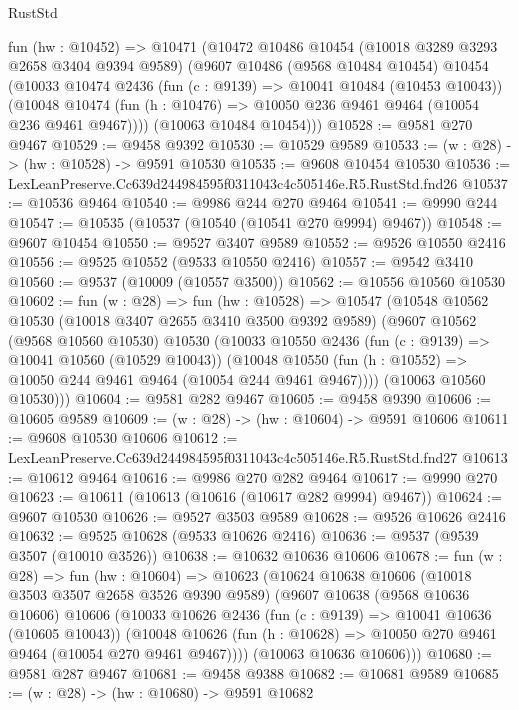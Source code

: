 \begin{lexlean}{RustStd}
\begin{coremodule}
  fun (hw : @10452) =>
  @10471
    (@10472
      @10486
      @10454
      (@10018 @3289 @3293 @2658 @3404 @9394 @9589)
      (@9607
        @10486
        (@9568 @10484 @10454)
        @10454
        (@10033
          @10474
          @2436
          (fun (c : @9139) => @10041 @10484 (@10453 @10043))
          (@10048 @10474 (fun (h : @10476) => @10050 @236 @9461 @9464 (@10054 @236 @9461 @9467))))
        (@10063 @10484 @10454)))
@10528 := @9581 @270 @9467
@10529 := @9458 @9392
@10530 := @10529 @9589
@10533 := (w : @28) -> (hw : @10528) -> @9591 @10530
@10535 := @9608 @10454 @10530
@10536 := LexLeanPreserve.Cc639d244984595f0311043c4c505146e.R5.RustStd.fnd26
@10537 := @10536 @9464
@10540 := @9986 @244 @270 @9464
@10541 := @9990 @244
@10547 := @10535 (@10537 (@10540 (@10541 @270 @9994) @9467))
@10548 := @9607 @10454
@10550 := @9527 @3407 @9589
@10552 := @9526 @10550 @2416
@10556 := @9525 @10552 (@9533 @10550 @2416)
@10557 := @9542 @3410
@10560 := @9537 (@10009 (@10557 @3500))
@10562 := @10556 @10560 @10530
@10602 := fun (w : @28) =>
  fun (hw : @10528) =>
  @10547
    (@10548
      @10562
      @10530
      (@10018 @3407 @2655 @3410 @3500 @9392 @9589)
      (@9607
        @10562
        (@9568 @10560 @10530)
        @10530
        (@10033
          @10550
          @2436
          (fun (c : @9139) => @10041 @10560 (@10529 @10043))
          (@10048 @10550 (fun (h : @10552) => @10050 @244 @9461 @9464 (@10054 @244 @9461 @9467))))
        (@10063 @10560 @10530)))
@10604 := @9581 @282 @9467
@10605 := @9458 @9390
@10606 := @10605 @9589
@10609 := (w : @28) -> (hw : @10604) -> @9591 @10606
@10611 := @9608 @10530 @10606
@10612 := LexLeanPreserve.Cc639d244984595f0311043c4c505146e.R5.RustStd.fnd27
@10613 := @10612 @9464
@10616 := @9986 @270 @282 @9464
@10617 := @9990 @270
@10623 := @10611 (@10613 (@10616 (@10617 @282 @9994) @9467))
@10624 := @9607 @10530
@10626 := @9527 @3503 @9589
@10628 := @9526 @10626 @2416
@10632 := @9525 @10628 (@9533 @10626 @2416)
@10636 := @9537 (@9539 @3507 (@10010 @3526))
@10638 := @10632 @10636 @10606
@10678 := fun (w : @28) =>
  fun (hw : @10604) =>
  @10623
    (@10624
      @10638
      @10606
      (@10018 @3503 @3507 @2658 @3526 @9390 @9589)
      (@9607
        @10638
        (@9568 @10636 @10606)
        @10606
        (@10033
          @10626
          @2436
          (fun (c : @9139) => @10041 @10636 (@10605 @10043))
          (@10048 @10626 (fun (h : @10628) => @10050 @270 @9461 @9464 (@10054 @270 @9461 @9467))))
        (@10063 @10636 @10606)))
@10680 := @9581 @287 @9467
@10681 := @9458 @9388
@10682 := @10681 @9589
@10685 := (w : @28) -> (hw : @10680) -> @9591 @10682

\end{coremodule}
\end{lexlean}
